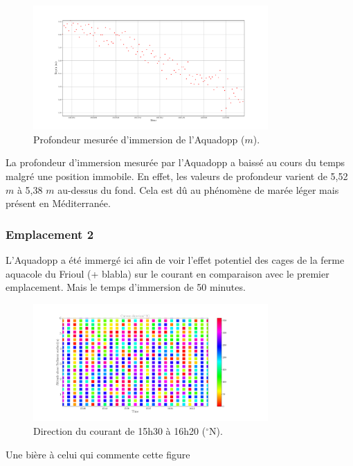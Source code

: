 \documentclass[12pt]{article}
\begin{document}
\begin{figure}[!ht]
	\begin{center}
		\includegraphics[width=0.8\textwidth]{Figure_2.png}
		\caption{Profondeur mesurée d'immersion de l'Aquadopp ($m$).}
	\end{center}
\end{figure}
La profondeur d'immersion mesurée par l'Aquadopp a baissé au cours du temps malgré une position immobile. En effet, les valeurs de profondeur varient de 5,52 $m$ à 5,38 $m$ au-dessus du fond. Cela est dû au phénomène de marée léger mais présent en Méditerranée.

\subsubsection{Emplacement 2}
L'Aquadopp a été immergé ici afin de voir l'effet potentiel des cages de la ferme aquacole du Frioul (+ blabla) sur le courant en comparaison avec le premier emplacement. Mais le temps d'immersion de 50 minutes.\\

\begin{figure}[!ht]
	\begin{center}
		\includegraphics[width=0.8\textwidth]{18032102scatterdirection.png}
		\caption{Direction du courant de 15h30 à 16h20 ($^{\circ}$N).}
	\end{center}
\end{figure}
Une bière à celui qui commente cette figure
\end{document}
